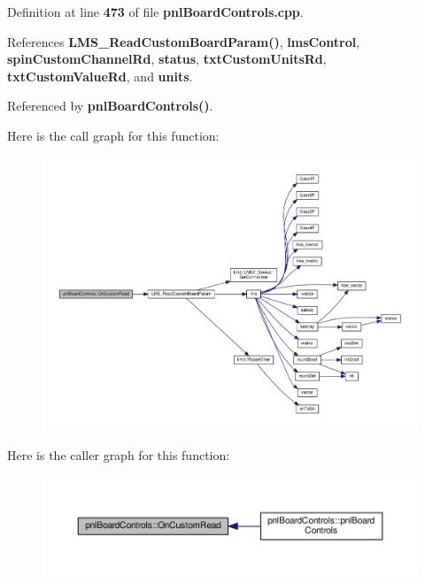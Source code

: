Definition at line {\bf 473} of file {\bf pnl\+Board\+Controls.\+cpp}.



References {\bf L\+M\+S\+\_\+\+Read\+Custom\+Board\+Param()}, {\bf lms\+Control}, {\bf spin\+Custom\+Channel\+Rd}, {\bf status}, {\bf txt\+Custom\+Units\+Rd}, {\bf txt\+Custom\+Value\+Rd}, and {\bf units}.



Referenced by {\bf pnl\+Board\+Controls()}.



Here is the call graph for this function\+:
\nopagebreak
\begin{figure}[H]
\begin{center}
\leavevmode
\includegraphics[width=350pt]{df/d93/classpnlBoardControls_a1d4680b646ea492b1e25db6e546ee806_cgraph}
\end{center}
\end{figure}




Here is the caller graph for this function\+:
\nopagebreak
\begin{figure}[H]
\begin{center}
\leavevmode
\includegraphics[width=350pt]{df/d93/classpnlBoardControls_a1d4680b646ea492b1e25db6e546ee806_icgraph}
\end{center}
\end{figure}


